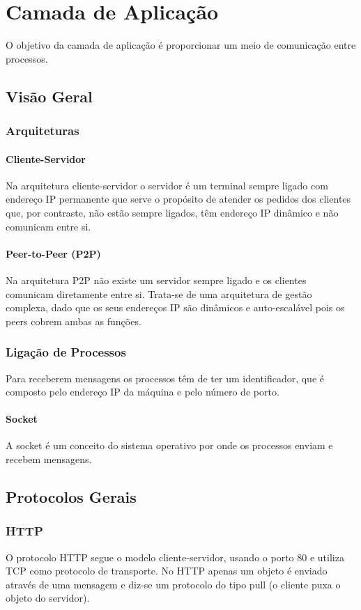 \documentclass[10pt,a4paper]{report}
\begin{document}
\hypersetup{
    colorlinks,
    citecolor=black,
    filecolor=black,
    linkcolor=black,
    urlcolor=black
}


\dominitoc
\tableofcontents


\chapter{Camada de Aplicação}
O objetivo da camada de aplicação é proporcionar um meio de comunicação entre processos.
\minitoc
\section{Visão Geral}
\subsection{Arquiteturas}
\subsubsection{Cliente-Servidor}
Na arquitetura cliente-servidor o servidor é um terminal sempre ligado com endereço IP permanente que serve o propósito de atender os pedidos dos clientes que, por contraste, não estão sempre ligados, têm endereço IP dinâmico e não comunicam entre si.
\subsubsection{Peer-to-Peer (P2P)}
Na arquitetura P2P não existe um servidor sempre ligado e os clientes comunicam diretamente entre si. Trata-se de uma arquitetura de gestão complexa, dado que os seus endereços IP são dinâmicos e auto-escalável pois os peers cobrem ambas as funções.
\subsection{Ligação de Processos}
Para receberem mensagens os processos têm de ter um identificador, que é composto pelo endereço IP da máquina e pelo número de porto.
\subsubsection{Socket}
A socket é um conceito do sistema operativo por onde os processos enviam e recebem mensagens.
\section{Protocolos Gerais}
\subsection{HTTP}
O protocolo HTTP segue o modelo cliente-servidor, usando o porto 80 e utiliza TCP como protocolo de transporte. No HTTP apenas um objeto é enviado através de uma mensagem e diz-se um protocolo do tipo pull (o cliente puxa o objeto do servidor).
\end{document}
